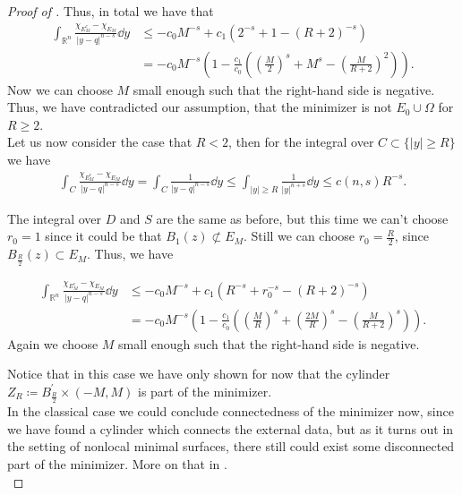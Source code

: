 \begin{proof}[Proof of ]
	Thus, in total we have that
	\begin{align*}
		\int_{\mathbb{R}^n} \frac{\chi_{E_M^c} - \chi_{E_M}}{\lvert y - q \rvert^{n - s}} \dd{y}
		 & \leq - c_0 M^{- s} + c_1 (2^{- s} + 1 - {(R + 2)}^{- s}) \\
		 & = - c_0 M^{- s} \left(1 - \frac{c_1}{c_0} \left({\left(\frac{M}{2}\right)}^s + M^s - {\left(\frac{M}{R + 2}\right)}^2\right)\right).
	\end{align*}
	Now we can choose \( M \) small enough such that the right-hand side is negative. Thus, we have
	contradicted our assumption, that the minimizer is not \( E_0 \cup \Omega \) for \( R \geq 2 \). \\

	Let us now consider the case that \( R < 2 \), then for the integral over \( C \subset \{\lvert y
	\rvert \geq R \} \) we have
	\begin{align*}
		\int_C \frac{\chi_{E_M^c} - \chi_{E_M}}{\lvert y - q \rvert^{n - s}} \dd{y}
		= \int_C \frac{1}{\lvert y - q \rvert^{n - s}} \dd{y}
		\leq \int_{\lvert y \rvert \geq R} \frac{1}{\lvert y \rvert^{n + s}} \dd{y}
		\leq c(n, s) R^{- s}.
	\end{align*}

	The integral over \( D \) and \( S \) are the same as before, but this time we can't choose \( r_0
	= 1 \) since it could be that \( B_1 (z) \not\subset E_M \). Still we can choose \( r_0 =
	\frac{R}{2} \), since \( B_{\frac{R}{2}} (z) \subset E_M \). Thus, we have

	\begin{align*}
		\int_{\mathbb{R}^n} \frac{\chi_{E_M^c} - \chi_{E_M}}{\lvert y - q \rvert^{n - s}} \dd{y}
		 & \leq - c_0 M^{-s} + c_1 (R^{-s} + r_0^{-s} - {(R + 2)}^{-s}) \\
		 & = - c_0 M^{-s} \left(1 - \frac{c_1}{c_0} \left({\left(\frac{M}{R}\right)}^s + {\left(\frac{2M}{R}\right)}^s - {\left(\frac{M}{R + 2}\right)}^s\right)\right).
	\end{align*}
	Again we choose \( M \) small enough such that the right-hand side is negative.

	Notice that in this case we have only shown for now that the cylinder \( Z_R \coloneqq
	B^\prime_{\frac{R}{2}} \times(- M, M) \) is part of the minimizer. \\
	In the classical case we could conclude connectedness of the minimizer now, since we have found a
	cylinder which connects the external data, but as it turns out in the setting of nonlocal minimal
	surfaces, there still could exist some disconnected part of the minimizer. More on that in
	. \\


\end{proof}
